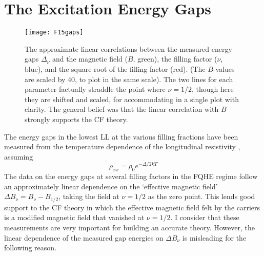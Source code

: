 \documentclass[aps,preprint,12pt,tightenlines]{revtex4}%
\begin{document}
\section{The Excitation Energy Gaps}

\begin{figure}
	\centering
	\texttt{[image: F15gaps]}
	\caption{The approximate linear correlations between the measured energy gaps $\Delta_{\nu}$ and the magnetic field ($B$, green), the filling factor ($\nu$, blue), and the square root of the filling factor (red). (The $B$-values are scaled by 40, to plot in the same scale). The two lines for each parameter factually straddle the point where $\nu=1/2$, though here they are shifted and scaled, for accommodating in a single plot with clarity. The general belief was that the linear correlation with $B$ strongly supports the CF theory.}
	\label{fig:gaps}
\end{figure}

The energy gaps in the lowest LL at the various filling fractions
have been measured from the temperature dependence of the longitudinal
resistivity \cite{Stormer-gaps}, assuming
\begin{equation}
\rho_{xx}=\rho_{0}e^{-\Delta/2kT}%
\end{equation}
The data on the energy gaps at several  filling factors in the FQHE regime follow an approximately linear dependence on the `effective magnetic field' $\Delta B_{\nu}=B_{\nu}-B_{1/2}$, taking the field at $\nu=1/2$ as the zero point. This lends good support to the CF theory in which the effective magnetic field felt by the carriers is a modified magnetic field that vanished at $\nu=1/2$. I consider that these measurements are very important for building an accurate
theory. However, the linear dependence of the measured gap
energies on $\Delta B_{\nu}$  is misleading for the following reason.
\end{document}

